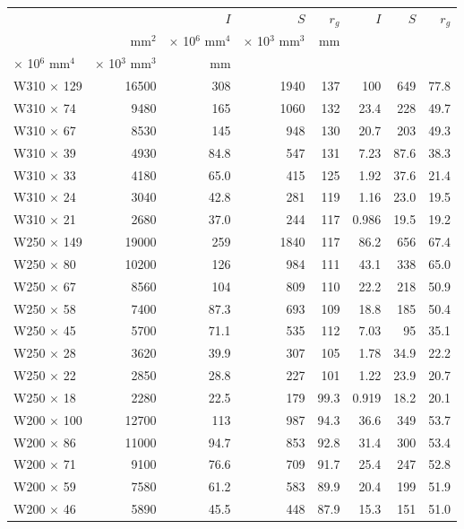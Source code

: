 \documentclass[a4paper,openany,nobib]{tufte-book}
\begin{document}
{{\begin{center}
\begin{tabular}{lrrrrrrr}
\toprule
 &  & \(I\) & \(S\) & \(r_g\) & \(I\) & \(S\) & \(r_g\)\\
 & mm\(^2\) & \(\times\) 10\(^6\) mm\(^4\) & \(\times\) 10\(^3\) mm\(^3\) & mm &  &  & \\
\(\times\) 10\(^6\) mm\(^4\) & \(\times\) 10\(^3\) mm\(^3\) & mm &  &  &  &  & \\
\midrule
W310 \(\times\) 129 & 16500 & 308 & 1940 & 137 & 100 & 649 & 77.8\\
W310 \(\times\) 74 & 9480 & 165 & 1060 & 132 & 23.4 & 228 & 49.7\\
W310 \(\times\) 67 & 8530 & 145 & 948 & 130 & 20.7 & 203 & 49.3\\
W310 \(\times\) 39 & 4930 & 84.8 & 547 & 131 & 7.23 & 87.6 & 38.3\\
W310 \(\times\) 33 & 4180 & 65.0 & 415 & 125 & 1.92 & 37.6 & 21.4\\
W310 \(\times\) 24 & 3040 & 42.8 & 281 & 119 & 1.16 & 23.0 & 19.5\\
W310 \(\times\) 21 & 2680 & 37.0 & 244 & 117 & 0.986 & 19.5 & 19.2\\
W250 \(\times\) 149 & 19000 & 259 & 1840 & 117 & 86.2 & 656 & 67.4\\
W250 \(\times\) 80 & 10200 & 126 & 984 & 111 & 43.1 & 338 & 65.0\\
W250 \(\times\) 67 & 8560 & 104 & 809 & 110 & 22.2 & 218 & 50.9\\
W250 \(\times\) 58 & 7400 & 87.3 & 693 & 109 & 18.8 & 185 & 50.4\\
W250 \(\times\) 45 & 5700 & 71.1 & 535 & 112 & 7.03 & 95 & 35.1\\
W250 \(\times\) 28 & 3620 & 39.9 & 307 & 105 & 1.78 & 34.9 & 22.2\\
W250 \(\times\) 22 & 2850 & 28.8 & 227 & 101 & 1.22 & 23.9 & 20.7\\
W250 \(\times\) 18 & 2280 & 22.5 & 179 & 99.3 & 0.919 & 18.2 & 20.1\\
W200 \(\times\) 100 & 12700 & 113 & 987 & 94.3 & 36.6 & 349 & 53.7\\
W200 \(\times\) 86 & 11000 & 94.7 & 853 & 92.8 & 31.4 & 300 & 53.4\\
W200 \(\times\) 71 & 9100 & 76.6 & 709 & 91.7 & 25.4 & 247 & 52.8\\
W200 \(\times\) 59 & 7580 & 61.2 & 583 & 89.9 & 20.4 & 199 & 51.9\\
W200 \(\times\) 46 & 5890 & 45.5 & 448 & 87.9 & 15.3 & 151 & 51.0\\

\end{tabular}
\end{center}}}
\end{document}
